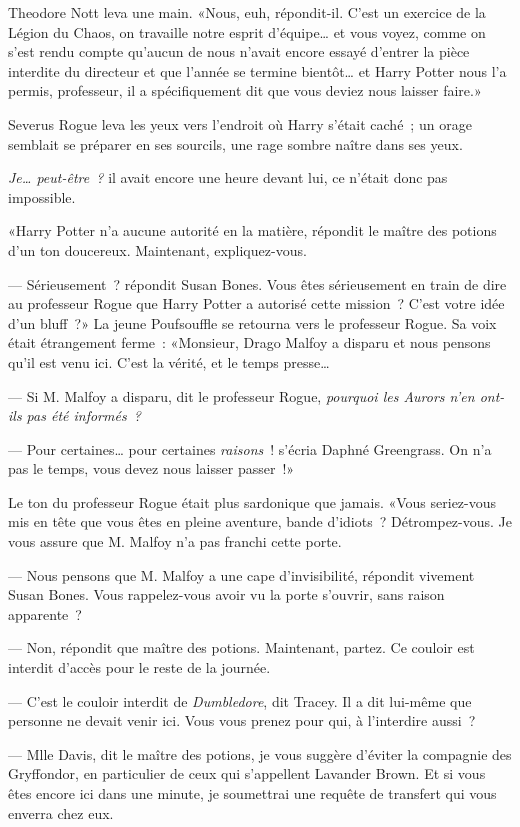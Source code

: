 Theodore Nott leva une main. «Nous, euh, répondit-il. C'est un exercice de la Légion du Chaos, on travaille notre esprit d'équipe… et vous voyez, comme on s'est rendu compte qu'aucun de nous n'avait encore essayé d'entrer la pièce interdite du directeur et que l'année se termine bientôt… et Harry Potter nous l'a permis, professeur, il a spécifiquement dit que vous deviez nous laisser faire.»

Severus Rogue leva les yeux vers l'endroit où Harry s'était caché~; un orage semblait se préparer en ses sourcils, une rage sombre naître dans ses yeux.

\emph{Je… peut-être~?} il avait encore une heure devant lui, ce n'était donc pas impossible.

«Harry Potter n'a aucune autorité en la matière, répondit le maître des potions d'un ton doucereux. Maintenant, expliquez-vous.

--- Sérieusement~? répondit Susan Bones. Vous êtes sérieusement en train de dire au professeur Rogue que Harry Potter a autorisé cette mission~? C'est votre idée d'un bluff~?» La jeune Poufsouffle se retourna vers le professeur Rogue. Sa voix était étrangement ferme~: «Monsieur, Drago Malfoy a disparu et nous pensons qu'il est venu ici. C'est la vérité, et le temps presse…

--- Si M. Malfoy a disparu, dit le professeur Rogue, \emph{pourquoi les Aurors n'en ont-ils pas été informés~?}

--- Pour certaines… pour certaines \emph{raisons}~! s'écria Daphné Greengrass. On n'a pas le temps, vous devez nous laisser passer~!»

Le ton du professeur Rogue était plus sardonique que jamais. «Vous seriez-vous mis en tête que vous êtes en pleine aventure, bande d'idiots~? Détrompez-vous. Je vous assure que M. Malfoy n'a pas franchi cette porte.

--- Nous pensons que M. Malfoy a une cape d'invisibilité, répondit vivement Susan Bones. Vous rappelez-vous avoir vu la porte s'ouvrir, sans raison apparente~?

--- Non, répondit que maître des potions. Maintenant, partez. Ce couloir est interdit d'accès pour le reste de la journée.

--- C'est le couloir interdit de \emph{Dumbledore}, dit Tracey. Il a dit lui-même que personne ne devait venir ici. Vous vous prenez pour qui, à l'interdire aussi~?

--- Mlle Davis, dit le maître des potions, je vous suggère d'éviter la compagnie des Gryffondor, en particulier de ceux qui s'appellent Lavander Brown. Et si vous êtes encore ici dans une minute, je soumettrai une requête de transfert qui vous enverra chez eux.

